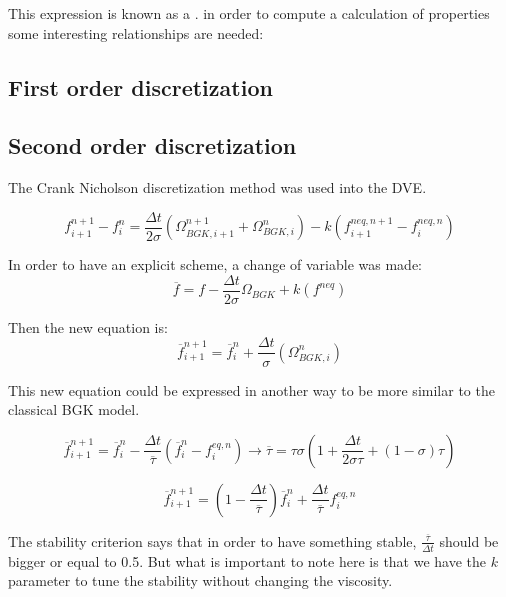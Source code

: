 \documentclass{article}
\begin{document}
This expression is known as a . in order to compute a calculation of properties some interesting relationships are needed:
\subsection{First order discretization}

\subsection{Second order discretization}
The Crank Nicholson discretization method was used into the DVE.

\begin{equation}
    f_{i+1}^{n+1} -f_{i}^{n} =\frac{\Delta t}{2\sigma}\left( \Omega _{BGK,i+1}^{n+1} +\Omega _{BGK,i}^{n}\right) -k\left( f_{i+1}^{neq,n+1} -f_{i}^{neq,n}\right)
\end{equation}

In order to have an explicit scheme, a change of variable was made:
\begin{equation}
    \overline{f} =f-\frac{\Delta t}{2\sigma}\Omega _{BGK} +k\left( f^{neq}\right)
\end{equation}

Then the new equation is:
\begin{equation}
    \overline{f}_{i+1}^{n+1} =\overline{f}_{i}^{n} +\frac{\Delta t}{\sigma}\left( \Omega _{BGK,i}^{n}\right)
\end{equation}

This new equation could be expressed in another way to be more similar to the classical BGK model.

\begin{equation}
    \overline{f}_{i+1}^{n+1} =\overline{f}_{i}^{n} -\frac{\Delta t}{\overline{\tau }}\left(\overline{f}_{i}^{n} -f_{i}^{eq,n}\right)\rightarrow \overline{\tau } =\tau\sigma\left(1+\frac{\Delta t}{2\sigma\tau}+(1-\sigma)\tau\right)
\end{equation}

\begin{equation*}
    \overline{f}_{i+1}^{n+1} =(1-\frac{\Delta t}{\overline{\tau }})\overline{f}_{i}^{n} + \frac{\Delta t}{\overline{\tau }}f_{i}^{eq,n}
\end{equation*}

The stability criterion says that in order to have something stable, $\frac{\overline{\tau}}{\Delta t}$ should be bigger or equal to 0.5.
But what is important to note here is that we have the $k$ parameter to tune the stability without changing the viscosity.
\end{document}
